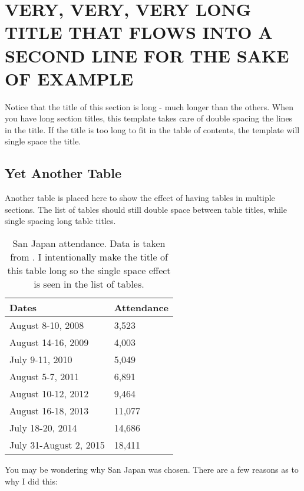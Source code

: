 

\chapter{VERY, VERY, VERY LONG TITLE THAT FLOWS INTO A SECOND LINE FOR THE SAKE OF EXAMPLE}

Notice that the title of this section is long - much longer than the others. When you have long section titles, this template takes care of double spacing the lines in the title. If the title is too long to fit in the table of contents, the template will single space the title.

\section{Yet Another Table}

Another table is placed here to show the effect of having tables in multiple sections. The list of tables should still double space between table titles, while single spacing long table titles.

\begin{table}[ht]
	\centering
	\begin{tabular}{|l|l|}
		\hline
		Dates & Attendance  \\ \hline
		August 8-10, 2008 & 3,523  \\ \hline
		August 14-16, 2009 & 4,003 \\ \hline
		July 9-11, 2010 & 5,049 \\ \hline
		August 5-7, 2011 & 6,891  \\ \hline
		August 10-12, 2012 & 9,464  \\ \hline
		August 16-18, 2013 & 11,077  \\ \hline
		July 18-20, 2014 & 14,686 \\ \hline
		July 31-August 2, 2015 & 18,411  \\ \hline
	\end{tabular}
	\caption{San Japan attendance. Data is taken from \cite{ANCONS}. I intentionally make the title of this table long so the single space effect is seen in the list of tables.}
\end{table}

You may be wondering why San Japan was chosen. There are a few reasons as to why I did this:

